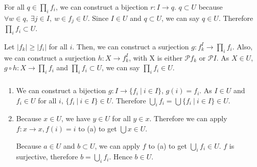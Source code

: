 \documentclass{article}
\begin{document}
\subsubsection{}

\showArt

For all $q \in \prod_i f_i$, we can construct a bijection $r : I \rightarrow q$. $q \subset U$ because $\forall w \in q,\ \exists j \in I,\ w \in f_j \in U$. Since $I \in U$ and $q \subset U$, we can say $q \in U$. Therefore $\prod_i f_i \subset U$.

Let $|f_k| \geq |f_i|$ for all $i$. Then, we can construct a surjection $g : f_k^I \rightarrow \prod_i f_i$. Also, we can construct a surjection $h : X \rightarrow f_k^I$, with X is either $\mathcal{P} f_k$ or $\mathcal{P} I$. As $X \in U$, $g \circ h : X \rightarrow \prod_i f_i$ and $\prod_i f_i \subset U$, we can say $\prod_i f_i \in U$.

\subsubsection{}



\showArt

\begin{enumerate}[label=(\alph*)]
\item We can construct a bijection $g :  I \rightarrow \{f_i\ |\ i \in I\}$, $g(i) = f_i$. As $I \in U$ and $f_i \in U$ for all $i$, $\{f_i\ |\ i \in I\} \in U$. Therefore $ \bigcup_i f_i = \bigcup \{f_i\ |\ i \in I\} \in U$.
\item Because $x \in U$, we have $y \in U$ for all $y \in x$. Therefore we can apply $f : x \rightarrow x, f(i) = i$ to (a) to get $\bigcup x \in U$.

Because $a \in U$ and $b \subset U$, we can apply $f$ to (a) to get $\bigcup_i f_i \in U$. $f$ is surjective, therefore $b = \bigcup_i f_i$. Hence $b \in U$.
\end{enumerate}

\subsection{}

\subsection{}

\section{}
\end{document}
